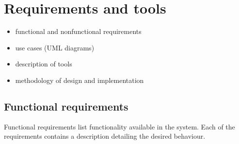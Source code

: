 \chapter{Requirements and tools}

\begin{itemize}
\item functional and nonfunctional requirements
\item use cases (UML diagrams)
\item description of tools
\item methodology of design and implementation
\end{itemize}

\section{Functional requirements}

Functional requirements list functionality available in the system. Each of the requirements contains a description detailing the desired behaviour.

